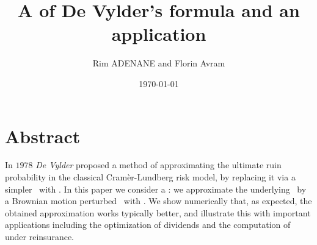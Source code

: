 \documentclass[slidetop,lecno,12pt,fleqn,mathserif]{article}
\author{Rim ADENANE and Florin Avram}
\title{A \gene of De Vylder's formula and an application}
\date{\today}
\def\BM{Brownian motion } \def\r{\rho}
\begin{document}
\maketitle
\tableofcontents

\section{Abstract}
In $1978$ \textit{De Vylder} proposed a method of approximating the ultimate ruin probability in the classical  Cramèr-Lundberg risk model, by replacing it via a simpler \proc \ with \expoj.
In this paper we consider a \gene : we approximate the underlying \proc \ by a \BM perturbed \proc \ with  \expoj. We show numerically that, as expected, the obtained approximation works typically better, and illustrate this with  important applications including the optimization of dividends and the computation of \rps under reinsurance.

%





\small


\end{document}
